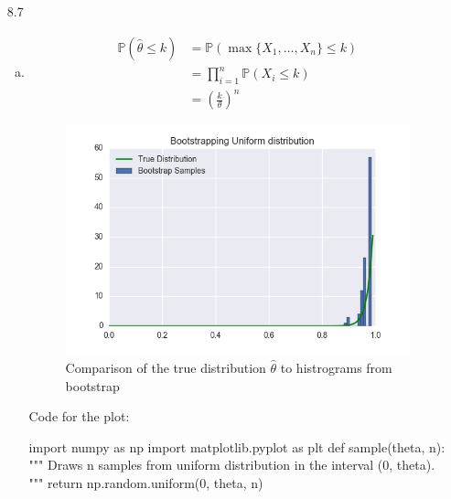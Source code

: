 \documentclass[a4paper,10pt]{article}
\theoremstyle{definition}
\begin{document}
\begin{enumerate}
\item[8.7]
\begin{enumerate}[(a)]
\item 
\begin{align*}
\mathbb{P}(\hat{\theta}\leq k) &= \mathbb{P}(\max\{X_1,\ldots,X_n\}\leq k)\\
&= \prod_{i=1}^{n}\mathbb{P}(X_i\leq k)\\
&=\left(\frac{k}{\theta}\right)^n
\end{align*}
\begin{figure}[h]
\centering
\includegraphics[scale=1]{bootstrap1.png}
\caption{Comparison of the true distribution $\hat{\theta}$ to histrograms from bootstrap}
\end{figure}

Code for the plot:
\begin{python}
import numpy as np
import matplotlib.pyplot as plt
def sample(theta, n):
    """
    Draws n samples from uniform distribution in the interval (0, theta).
    """
    return np.random.uniform(0, theta, n)


\end{python}
\end{enumerate}
\end{enumerate}
\end{document}
